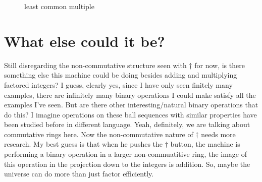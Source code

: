 \documentclass[12pt]{article}
\newcommand{\fancy}[1]{\mathcal{#1}}
\newcommand{\C}[1]{\fancy{C}_{#1}}
\def\C{\fancy{C}}
\def\lcm{\bigtriangleup}
\newcommand{\Bond}[6]%
{ \begin{pgfonlayer}{background}
        \colorlet{InColor}{#4}
        \colorlet{OutColor}{#5}
        \foreach \I in {#6,...,1}
        {   \pgfmathsetlengthmacro{\r}{#3/#6*\I}
            \pgfmathsetmacro{\C}{sqrt(1-\r*\r/#3/#3)*100}
            \draw[InColor!\C!OutColor, line width=\r] (#1.center) -- (#2.center);
        }
    \end{pgfonlayer}
}
\newcommand{\BlackBond}[2]%
{   \Bond{#1}{#2}{0.7071mm}{black!25}{black!25!black}{10}
}
\begin{document}
\begin{figure}\label{LCM}
\centering
{}
\caption{least common multiple}
\end{figure}
\section{What else could it be?}
Still disregarding the non-commutative structure seen with $\dagger$ for now, is there something else this machine could be doing besides adding and multiplying factored integers?  
I guess, clearly yes, since I have only seen finitely many examples, there are infinitely many binary operations I could make satisfy all the examples I've seen.  But are there
other interesting/natural binary operations that do this?  I imagine operations on these ball sequences with similar properties have been studied before in different language.  
Yeah, definitely, we are talking about commutative rings here.  Now the non-commutative nature of $\dagger$ needs more research.  My best guess is that when
he pushes the $\dagger$ button, the machine is performing a binary operation in a larger non-commuatitive ring, the image of this operation in the projection down to the integers 
is addition.  So, maybe the universe can do more than just factor efficiently.
\end{document}
